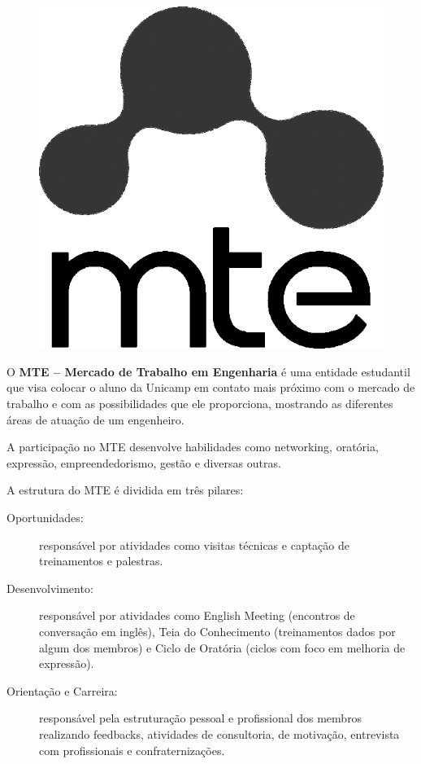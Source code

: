 \begin{figure}[H]
    \centering
    \includegraphics[scale=0.40]{img/mte.png}
\end{figure}

O \textbf{MTE -- Mercado de Trabalho em Engenharia} é uma entidade estudantil que visa colocar o aluno da Unicamp em
contato mais próximo com o mercado de trabalho e com as possibilidades que ele
proporciona, mostrando as diferentes áreas de atuação de um engenheiro.

A participação no MTE desenvolve habilidades como networking, oratória, expressão, empreendedorismo, gestão e diversas outras.

A estrutura do MTE é dividida em três pilares:

\begin{description}
\item[Oportunidades:] responsável por atividades como visitas técnicas e captação de treinamentos e palestras.
\item[Desenvolvimento:] responsável por atividades como English Meeting (encontros de conversação em inglês), Teia do Conhecimento (treinamentos dados por algum dos membros) e Ciclo de Oratória (ciclos com foco em melhoria de expressão).
\item[Orientação e Carreira:] responsável pela estruturação pessoal e profissional dos membros realizando feedbacks, atividades de consultoria, de motivação, entrevista com profissionais e confraternizações.
\end{description}

